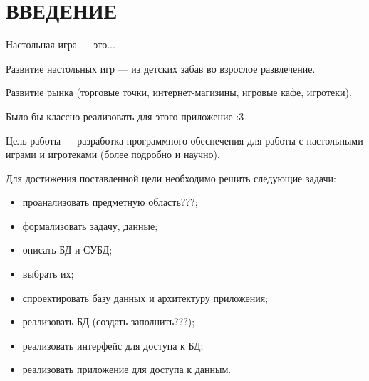 \chapter*{ВВЕДЕНИЕ}

Настольная игра --- это...

Развитие настольных игр --- из детских забав во взрослое развлечение.

Развитие рынка (торговые точки, интернет-магизины, игровые кафе, игротеки).

Было бы классно реализовать для этого приложение :3

Цель работы --- разработка программного обеспечения для работы с
настольными играми и игротеками (более подробно и научно).

Для достижения поставленной цели необходимо решить следующие задачи:
\begin{itemize}[left=\parindent]
    \item проанализовать предметную область???;
    \item формализовать задачу, данные;
    \item описать БД и СУБД;
    \item выбрать их;
    \item спроектировать базу данных и архитектуру приложения;
    \item реализовать БД (создать заполнить???);
    \item реализовать интерфейс для доступа к БД;
    \item реализовать приложение для доступа к данным.
\end{itemize}

